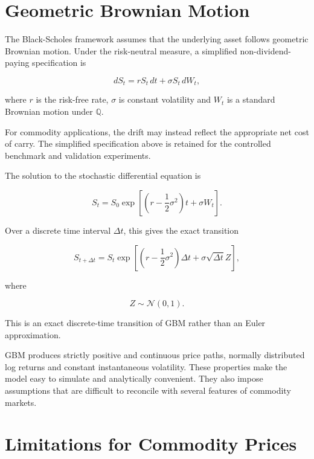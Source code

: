 \section{Geometric Brownian Motion}

The Black-Scholes framework assumes that the underlying asset follows geometric Brownian motion. Under the risk-neutral measure, a simplified non-dividend-paying specification is

\begin{equation}
dS_t
=
rS_t\,dt
+
\sigma S_t\,dW_t,
\end{equation}

where $r$ is the risk-free rate, $\sigma$ is constant volatility and $W_t$ is a standard Brownian motion under $\mathbb{Q}$.

For commodity applications, the drift may instead reflect the appropriate net cost of carry. The simplified specification above is retained for the controlled benchmark and validation experiments.

The solution to the stochastic differential equation is

\begin{equation}
S_t
=
S_0
\exp
\left[
\left(
r-\frac{1}{2}\sigma^2
\right)t
+
\sigma W_t
\right].
\end{equation}

Over a discrete time interval $\Delta t$, this gives the exact transition

\begin{equation}
S_{t+\Delta t}
=
S_t
\exp
\left[
\left(
r-\frac{1}{2}\sigma^2
\right)\Delta t
+
\sigma\sqrt{\Delta t}Z
\right],
\end{equation}

where

\begin{equation}
Z\sim\mathcal{N}(0,1).
\end{equation}

This is an exact discrete-time transition of GBM rather than an Euler approximation.

GBM produces strictly positive and continuous price paths, normally distributed log returns and constant instantaneous volatility. These properties make the model easy to simulate and analytically convenient. They also impose assumptions that are difficult to reconcile with several features of commodity markets.

\section{Limitations for Commodity Prices}

